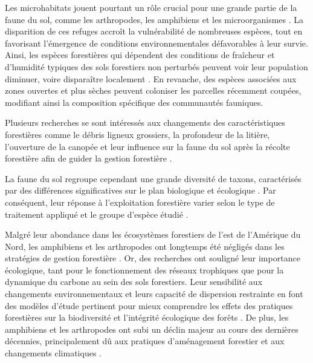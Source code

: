 Les microhabitats jouent pourtant un rôle crucial pour une grande partie de la faune du sol, comme les arthropodes, les amphibiens et les microorganismes \citep{Paillet2010Biodiversitydifferences,Fedrowitz2014Canretention,Chaudhary2016Impactforest}. 
La disparition de ces refuges accroît la vulnérabilité de nombreuses espèces, tout en favorisant l’émergence de conditions environnementales défavorables à leur survie. 
Ainsi, les espèces forestières qui dépendent des conditions de fraîcheur et d’humidité typiques des sols forestiers non perturbés peuvent voir leur population diminuer, voire disparaître localement \citep{Kudrin2023metaanalysiseffects}. 
En revanche, des espèces associées aux zones ouvertes et plus sèches peuvent coloniser les parcelles récemment coupées, modifiant ainsi la composition spécifique des communautés fauniques.

Plusieurs recherches se sont intéressés aux changements des caractéristiques forestières comme le débris ligneux grossiers, la profondeur de la litière, l'ouverture de la canopée 
et leur influence sur la faune du sol après la récolte forestière afin de guider la gestion forestière \citep{Semlitsch2002CriticalElements,McKenny2006Effectsstructural}. 

La faune du sol regroupe cependant une grande diversité de taxons, caractérisés par des différences significatives sur le plan biologique et écologique \citep{Kudrin2023metaanalysiseffects}. 
Par conséquent, leur réponse à l'exploitation forestière varier selon le type de traitement appliqué et le groupe d'espèce étudié \citep{Malmstrom2009Dynamicssoil,Paillet2010Biodiversitydifferences}.

Malgré leur abondance dans les écosystèmes forestiers de l'est de l'Amérique du Nord, les amphibiens et les arthropodes ont longtemps été négligés dans les stratégies de gestion forestière \citep{deMaynadier1995relationshipforest}. 
Or, des recherches ont souligné leur importance écologique, tant pour le fonctionnement des réseaux trophiques que pour la dynamique du carbone au sein des sols forestiers. 
Leur sensibilité aux changements environnementaux et leurs capacité de dispersion restrainte en font des modèles d’étude pertinent pour mieux comprendre les effets des pratiques forestières sur la biodiversité et l'intégrité écologique des forêts \citep{pongeVerticalDistributionCollembola2000,Ojala2001Dispersalmicroarthropods,birdChangesSoilLitter2004,Maleque2009Arthropodsbioindicators}.
De plus, les amphibiens et les arthropodes ont subi un déclin majeur au cours des dernières décennies, principalement dû aux pratiques d'aménagement forestier et aux changements climatiques \citep{Houlahan2000Quantitativeevidence,Stuart2004Statustrends,Warren2018projectedeffect,Wagner2021Insectdecline}. 

